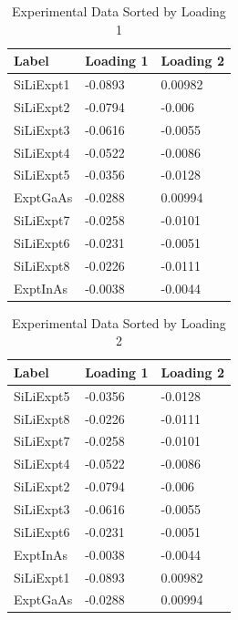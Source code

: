 \documentclass[12pt,letterpaper]{article}
\begin{document}
\begin{table}[ht]
  \begin{center}
  \begin{tabular}{|l|l|l|}
    \hline
    \textbf{Label} & \textbf{Loading 1} & \textbf{Loading 2} \\ \hline
    SiLiExpt1      & -0.0893            & 0.00982            \\ \hline
    SiLiExpt2      & -0.0794            & -0.006             \\ \hline
    SiLiExpt3      & -0.0616            & -0.0055            \\ \hline
    SiLiExpt4      & -0.0522            & -0.0086            \\ \hline
    SiLiExpt5      & -0.0356            & -0.0128            \\ \hline
    ExptGaAs       & -0.0288            & 0.00994            \\ \hline
    SiLiExpt7      & -0.0258            & -0.0101            \\ \hline
    SiLiExpt6      & -0.0231            & -0.0051            \\ \hline
    SiLiExpt8      & -0.0226            & -0.0111            \\ \hline
    ExptInAs       & -0.0038            & -0.0044            \\ \hline
  \end{tabular}
  \caption{Experimental Data Sorted by Loading 1}
  \end{center}
\end{table}

\begin{table}[h]
  \begin{center}
  \begin{tabular}{|l|l|l|}
    \hline
    \textbf{Label} & \textbf{Loading 1} & \textbf{Loading 2} \\ \hline
    SiLiExpt5      & -0.0356            & -0.0128            \\ \hline
    SiLiExpt8      & -0.0226            & -0.0111            \\ \hline
    SiLiExpt7      & -0.0258            & -0.0101            \\ \hline
    SiLiExpt4      & -0.0522            & -0.0086            \\ \hline
    SiLiExpt2      & -0.0794            & -0.006             \\ \hline
    SiLiExpt3      & -0.0616            & -0.0055            \\ \hline
    SiLiExpt6      & -0.0231            & -0.0051            \\ \hline
    ExptInAs       & -0.0038            & -0.0044            \\ \hline
    SiLiExpt1      & -0.0893            & 0.00982            \\ \hline
    ExptGaAs       & -0.0288            & 0.00994            \\ \hline
  \end{tabular}
  \caption{Experimental Data Sorted by Loading 2}
  \end{center}
\end{table}
\end{document}
